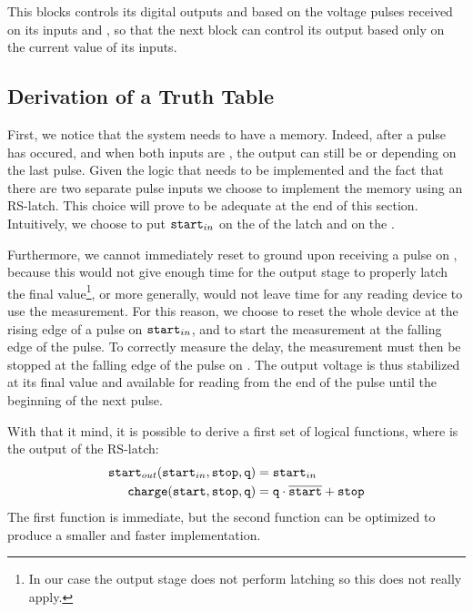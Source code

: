 This blocks controls its digital outputs  and  based on the voltage pulses received on its inputs  and , so that the next block  can control its output  based only on the current value of its inputs.

\subsection{Derivation of a Truth Table}
First, we notice that the system needs to have a memory.
Indeed, after a pulse has occured, and when both inputs are , the output  can still be  or  depending on the last pulse.
Given the logic that needs to be implemented and the fact that there are two separate pulse inputs we choose to implement the memory using an RS-latch.
This choice will prove to be adequate at the end of this section.
Intuitively, we choose to put $\mathtt{start}_{in}$ on the  of the latch and  on the .

Furthermore, we cannot immediately reset  to ground upon receiving a pulse on , because this would not give enough time for the output stage to properly latch the final value\footnote{In our case the output stage does not perform latching so this does not really apply.}, or more generally, would not leave time for any reading device to use the measurement.
For this reason, we choose to reset the whole device at the rising edge of a pulse on $\mathtt{start}_{in}$, and to start the measurement at the falling edge of the pulse.
To correctly measure the delay, the measurement must then be stopped at the falling edge of the pulse on .
The output voltage is thus stabilized at its final value and available for reading from the end of the  pulse until the beginning of the next  pulse.

With that it mind, it is possible to derive a first set of logical functions, where  is the output of the RS-latch:
\begin{align}
\mathtt{start}_{out}(\mathtt{start}_{in}, \mathtt{stop}, \mathtt{q}) &= \mathtt{start}_{in}\\
\mathtt{charge}(\mathtt{start}, \mathtt{stop}, \mathtt{q}) &= \mathtt{q}\cdot\overline{\mathtt{start}} + \mathtt{stop}\label{eqn:clogic}
\end{align}
The first function is immediate, but the second function can be optimized to produce a smaller and faster implementation.


